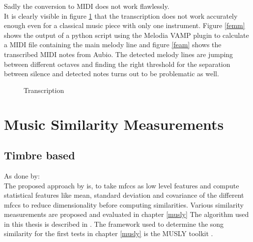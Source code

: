 \noindent Sadly the conversion to MIDI does not work flawlessly.\\
It is clearly visible in figure \ref{fig:transc} that the transcription does not work accurately enough even for a classical music piece with only one instrument. Figure \ref{femm} shows the output of a python script using the Melodia VAMP plugin to calculate a MIDI file containing the main melody line and figure \ref{feam} shows the transcribed MIDI notes from Aubio. The detected melody lines are jumping between different octaves and finding the right threshold for the separation between silence and detected notes turns out to be problematic as well.

\begin{figure}[htbp]
	\centering
	\caption{Transcription}
	\label{fig:transc}
\end{figure}
\FloatBarrier 

\section{Music Similarity Measurements}

\subsection{Timbre based}

As done by: \cite{schnitzer1}\\
The proposed approach by \cite{schnitzer1} is, to take mfccs as low level features and compute statistical features like mean, standard deviation and covariance of the different mfccs to reduce dimensionality before computing similarities.
Various similarity measurements are proposed and evaluated in chapter \ref{musly}
The algorithm used in this thesis is described in \cite[pp. 17ff]{schnitzer1}. The framework used to determine the song similarity for the first tests in chapter \ref{musly} is the MUSLY toolkit \cite{musly1}. 

